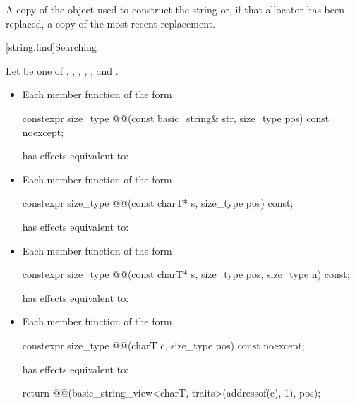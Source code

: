 \begin{itemdescr}
\pnum
\returns
A copy of the
object used to construct the string or, if that allocator has been replaced, a
copy of the most recent replacement.
\end{itemdescr}

[string.find]{Searching}

\pnum
{}%
%
%
%
%
%
Let  be one of
, , , ,
, and .

\begin{itemize}
\item
Each member function of the form
\begin{codeblock}
constexpr size_type @@(const basic_string& str, size_type pos) const noexcept;
\end{codeblock}
has effects equivalent to:

\item
Each member function of the form
\begin{codeblock}
constexpr size_type @@(const charT* s, size_type pos) const;
\end{codeblock}
has effects equivalent to:

\item
Each member function of the form
\begin{codeblock}
constexpr size_type @@(const charT* s, size_type pos, size_type n) const;
\end{codeblock}
has effects equivalent to:

\item
Each member function of the form
\begin{codeblock}
constexpr size_type @@(charT c, size_type pos) const noexcept;
\end{codeblock}
has effects equivalent to:
\begin{codeblock}
return @@(basic_string_view<charT, traits>(addressof(c), 1), pos);
\end{codeblock}
\end{itemize}

